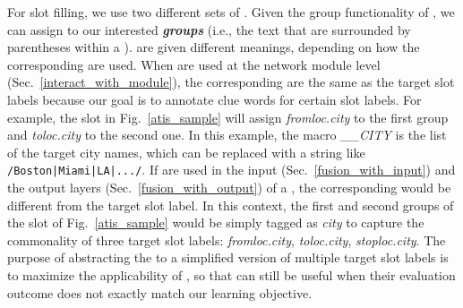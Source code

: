 For slot filling, we use two different sets of \REs. Given the group functionality of \RE, we can assign \REtags to our interested
\textbf{\emph{\RE groups}} (i.e., the text that are surrounded by parentheses within a \RE). \REtags are given different meanings,
depending on how the corresponding \REs are used. When \REs are used at the network module level (Sec.~\ref{interact_with_module}), the
corresponding \REtags are the same as the target slot labels because our goal is to annotate clue words for certain slot labels. For
example, the slot \RE in Fig.~\ref{atis_sample} will assign \emph{fromloc.city} to the first \RE group and \emph{toloc.city} to the second
one. In this example, the macro \emph{\_\_CITY} is the list of the target city names, which can be replaced with a string like
\texttt{/Boston|Miami|LA|.../}. If \REs are used in the input (Sec.~\ref{fusion_with_input}) and the output layers
(Sec.~\ref{fusion_with_output}) of a \NN, the corresponding \REtag would be different from the target slot label. In this context, the
first and second \RE groups of the slot \RE of Fig.~\ref{atis_sample} would be simply tagged as \emph{city} to capture the commonality of
three target slot labels: \emph{fromloc.city}, \emph{toloc.city}, \emph{stoploc.city}. The purpose of abstracting the \REtag to a
simplified version of multiple target slot labels is to maximize the applicability of \REs, so that \REs can still be useful when their
evaluation outcome does not exactly match our learning objective.
%

